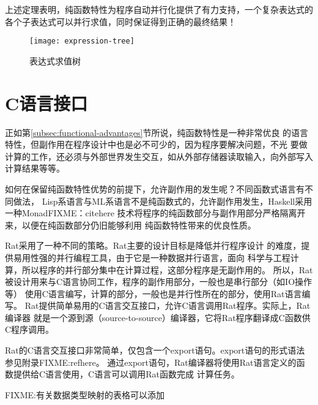 上述定理表明，纯函数特性为程序自动并行化提供了有力支持，一个复杂表达式的
各个子表达式可以并行求值，同时保证得到正确的最终结果！

\begin{quotation}
\end{quotation}
\begin{figure}
  \centering
  \texttt{[image: expression-tree]}
  \caption{表达式求值树}
  \label{fig:expression-tree}
\end{figure}

\section{C语言接口}\label{sec:c-interface}
正如第\ref{subsec:functional-advantages}节所说，纯函数特性是一种非常优良
的语言特性，但副作用在程序设计中也是必不可少的，因为程序要解决问题，不光
要做计算的工作，还必须与外部世界发生交互，如从外部存储器读取输入，向外部写入
计算结果等等。

如何在保留纯函数特性优势的前提下，允许副作用的发生呢？不同函数式语言有不同做法，
Lisp系语言与ML系语言不是纯函数式的，允许副作用发生，Haskell采用一种MonadFIXME：citehere
技术将程序的纯函数部分与副作用部分严格隔离开来，以便在纯函数部分仍旧能够利用
纯函数特性带来的优良性质。

Rat采用了一种不同的策略。Rat主要的设计目标是降低并行程序设计
的难度，提供易用性强的并行编程工具，由于它是一种数据并行语言，面向
科学与工程计算，所以程序的并行部分集中在计算过程，这部分程序是无副作用的。
所以，Rat被设计用来与C语言协同工作，程序的副作用部分，一般也是串行部分（如IO操作等）
使用C语言编写，计算的部分，一般也是并行性所在的部分，使用Rat语言编写。
Rat提供简单易用的C语言交互接口，允许C语言调用Rat程序。实际上，Rat编译器
就是一个源到源（source-to-source）编译器，它将Rat程序翻译成C函数供C程序调用。

Rat的C语言交互接口非常简单，仅包含一个export语句。export语句的形式语法参见附录FIXME:refhere。
通过export语句，Rat编译器将使用Rat语言定义的函数提供给C语言使用，C语言可以调用Rat函数完成
计算任务。

FIXME:有关数据类型映射的表格可以添加

